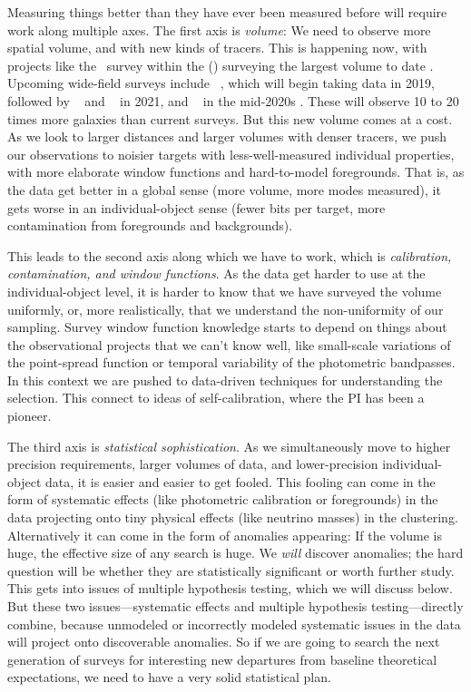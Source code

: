 \documentclass[12pt, fullpage, letterpaper]{article}
\begin{document}
Measuring things better than they have ever been measured before will require work along
multiple axes.
The first axis is \emph{volume}: We need to observe more spatial volume, and with new kinds
of tracers.
This is happening now, with projects like the \eBOSS\ survey within the  (\SDSSIV) surveying the largest volume to date
\citep{Dawson2015}.
Upcoming wide-field surveys include \DESI\ 
\citep{Aghamousa2016}, which will begin taking data in 2019, followed
by \NASA\ \project{Euclid} \citep{Amiaux2012} and
\LSST\ \citep{Ivezic2018} in 2021, and \NASA\  in the mid-2020s
\citep{Akeson2019}.
These will observe 10 to 20 times more galaxies than current surveys.
But this new volume comes at a cost. As we look to larger
distances and larger volumes with denser tracers, we push our
observations to noisier targets with less-well-measured individual
properties, with more elaborate window functions and hard-to-model foregrounds.
That is, as the data get better in a global sense (more volume, more
modes measured), it gets worse in an individual-object sense (fewer
bits per target, more contamination from foregrounds and backgrounds).

This leads to the second axis along which we have to work, which
is \emph{calibration, contamination, and window functions}.
As the data get harder to use at the individual-object level, it is
harder to know that we have surveyed the volume uniformly, or, more
realistically, that we understand the non-uniformity of our sampling.
Survey window function knowledge starts to depend on things about the
observational projects that we can't know well, like small-scale
variations of the point-spread function or temporal variability of the
photometric bandpasses.
In this context we are pushed to data-driven techniques for
understanding the selection.
This connect to ideas of
self-calibration, where the PI has been a pioneer.

The third axis is \emph{statistical sophistication}.
As we simultaneously move to higher precision requirements, larger
volumes of data, and lower-precision individual-object data, it is 
easier and easier to get fooled.
This fooling can come in the form of systematic effects (like
photometric calibration or foregrounds) in the data projecting onto
tiny physical effects (like neutrino masses) in the clustering.
Alternatively it can come in the form of anomalies appearing: If the volume is
huge, the effective size of any search is huge.
We \emph{will} discover anomalies; the hard question will be whether
they are statistically significant or worth further study.
This gets into issues of multiple hypothesis testing, which we will
discuss below.
But these two issues---systematic effects and multiple hypothesis
testing---directly combine, because unmodeled or incorrectly modeled
systematic issues in the data will project onto discoverable
anomalies.
So if we are going to search the next generation of surveys for
interesting new departures from baseline theoretical expectations,
we need to have a very solid statistical plan.
\end{document}
